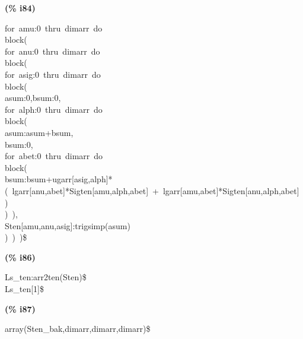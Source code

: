 \documentclass[fleqn]{article}
\begin{document}
\noindent%



\noindent
\begin{minipage}[t]{4.000000em}\color{red}\bfseries
(\% i84)	
\end{minipage}
\begin{minipage}[t]{\textwidth}\color{blue}
for\ amu:0\ thru\ dimarr\ do\\
block(\\
for\ anu:0\ thru\ dimarr\ do\\
block(\\
for\ asig:0\ thru\ dimarr\ do\\
block(\\
asum:0,bsum:0,\\
for\ alph:0\ thru\ dimarr\ do\\
block(\\
asum:asum+bsum,\\
bsum:0,\\
for\ abet:0\ thru\ dimarr\ do\\
block(\\
bsum:bsum+ugarr[asig,alph]*(\ lgarr[anu,abet]*Sigten[amu,alph,abet]\ +\ lgarr[amu,abet]*Sigten[anu,alph,abet]\ )\ \\
)\ ),\\
Sten[amu,anu,asig]:trigsimp(asum)\ \\
)\ )\ )\$
\end{minipage}

\noindent%



\noindent
\begin{minipage}[t]{4.000000em}\color{red}\bfseries
(\% i86)	
\end{minipage}
\begin{minipage}[t]{\textwidth}\color{blue}
Ls\_ten:arr2ten(Sten)\$\\
Ls\_ten[1]\$
\end{minipage}

\noindent%



\noindent
\begin{minipage}[t]{4.000000em}\color{red}\bfseries
(\% i87)	
\end{minipage}
\begin{minipage}[t]{\textwidth}\color{blue}
array(Sten\_bak,dimarr,dimarr,dimarr)\$
\end{minipage}

\noindent%
\end{document}
